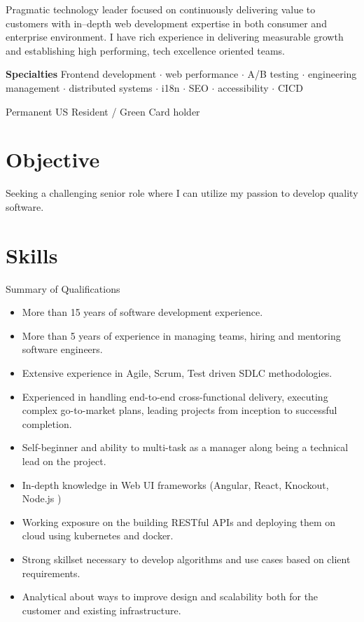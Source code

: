 \documentclass[11pt,a4paper,roman]{moderncv}       %
\begin{document}
\makecvtitle


\small{Pragmatic technology leader focused on continuously delivering value to customers with in--depth web development expertise in both consumer and enterprise environment. I have rich experience in delivering measurable growth and establishing high performing, tech excellence oriented teams.}

\bigskip

\small{\textbf{Specialties} Frontend development ${\cdot}$ web performance ${\cdot}$ A/B testing ${\cdot}$ engineering management ${\cdot}$ distributed systems ${\cdot}$ i18n ${\cdot}$ SEO ${\cdot}$ accessibility ${\cdot}$ CICD}

\bigskip

Permanent US Resident / Green Card holder

\section{Objective}

Seeking a challenging senior role where I can utilize my passion to develop quality software.

\section{Skills}
Summary of Qualifications

\begin{itemize}
    \item More than 15 years of software development experience.
    \item More than 5 years of experience in managing teams, hiring and mentoring software engineers.
    \item Extensive experience in Agile, Scrum, Test driven SDLC methodologies.
    \item Experienced in handling end-to-end cross-functional delivery, executing complex go-to-market plans, leading projects from inception to successful completion.
    \item Self-beginner and ability to multi-task as a manager along being a technical lead on the project.
    \item In-depth knowledge in Web UI frameworks (Angular, React, Knockout, Node.js )
    \item Working exposure on the building RESTful APIs and deploying them on cloud using kubernetes and docker.
    \item Strong skillset necessary to develop algorithms and use cases based on client requirements.
    \item Analytical about ways to improve design and scalability both for the customer and existing infrastructure.
\end{itemize}
\end{document}

